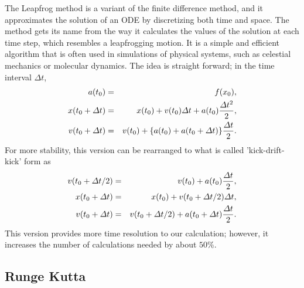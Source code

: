 \documentclass[a4paper,oneside,12pt]{report}
\numberwithin{equation}{chapter}
\begin{document}
The Leapfrog method is a variant of the finite difference method, and it approximates the solution of an ODE by discretizing both time and space. 
The method gets its name from the way it calculates the values of the solution at each time step, which resembles a leapfrogging motion. 
It is a simple and efficient algorithm that is often used in simulations of physical systems, such as celestial mechanics or molecular dynamics.
The idea is straight forward; in the time interval $\Delta t$, 
\vspace{-10pt}\begin{eqnarray}
    a(t_0) &=& f(x_0)   , \\
    x(t_0 + \Delta t) &=& x(t_0) + v(t_0)\Delta t + a(t_0)\frac{\Delta t^2}{2}   ,\label{eq:leapfrog_sync_x}\\
    v(t_0 + \Delta t) &=& v(t_0) + \{ a(t_0) + a(t_0 + \Delta t)\}\frac{\Delta t}{2} . \label{eq:leapfrog_sync_v}
\vspace{-10pt}\end{eqnarray}
For more stability, this version can be rearranged to what is called 'kick-drift-kick' form as
\vspace{-10pt}\begin{eqnarray} \label{eq:leapfrog}
    v(t_0 + \Delta t/2) &=& v(t_0) +  a(t_0)\frac{\Delta t}{2}   ,  \\
    x(t_0 + \Delta t) &=& x(t_0) + v(t_0 + \Delta t/2)\Delta t   , \\
    v(t_0 + \Delta t) &=& v(t_0 + \Delta t/2) + a(t_0 + \Delta t)\frac{\Delta t}{2} . 
\vspace{-10pt}\end{eqnarray}
This version provides more time resolution to our calculation; however, it increases the number of calculations needed by about $50\%$.

\subsection{Runge Kutta} \label{sec:rungekutta}
\end{document}
